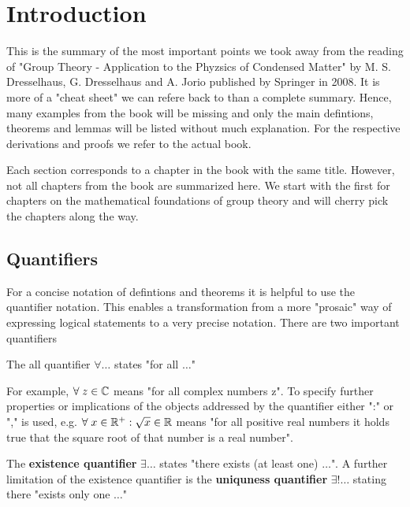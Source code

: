 \newpage
\section{Introduction \label{sec:00introduction}}
This is the summary of the most important points we took away from the reading of "Group Theory - Application to the Phyzsics of Condensed Matter" by M. S. Dresselhaus, G. Dresselhaus and A. Jorio published by Springer in 2008. It is more of a "cheat sheet" we can refere back to than a complete summary. Hence, many examples from the book will be missing and only the main defintions, theorems and lemmas will be listed without much explanation. For the respective derivations and proofs we refer to the actual book. \par
Each section corresponds to a chapter in the book with the same title. However, not all chapters from the book are summarized here. We start with the first for chapters on the mathematical foundations of group theory and will cherry pick the chapters along the way. 

\subsection{Quantifiers \label{sec:00-1quantifiers}}
For a concise notation of defintions and theorems it is helpful to use the quantifier notation. This enables a transformation from a more "prosaic" way of expressing logical statements to a very precise notation. There are two important quantifiers

\begin{dfn}\label{dfn:01_allquant}
The all quantifier $\forall \dots$ states "for all $\dots$"
\end{dfn}

For example, $\forall \; z \in \mathbb{C}$ means "for all complex numbers z". To specify further properties or implications of the objects addressed by the quantifier either ":" or "," is used, e.g. $\forall \; x \in \mathbb{R} ^+: \sqrt{x} \in \mathbb{R}$ means "for all positive real numbers it holds true that the square root of that number is a real number".

\begin{dfn}\label{dfn:02_exquant}
The \textbf{existence quantifier} $\exists \dots$ states "there exists (at least one) $\dots$". 
A further limitation of the existence quantifier is the \textbf{uniquness quantifier} $\exists ! \dots$ stating there "exists only one $\dots$"
\end{dfn}

